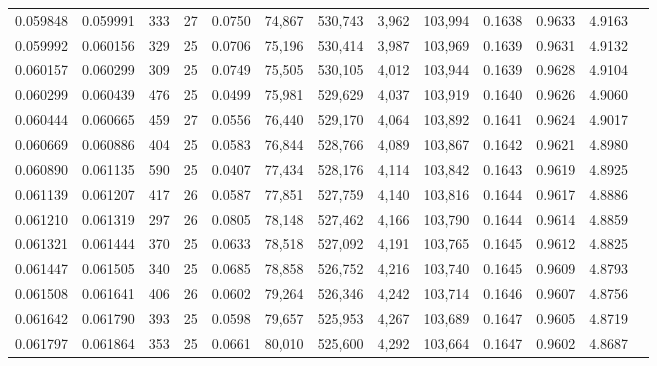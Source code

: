 \begin{tabular}{rrrrrrrrrrrrr}
0.059848 & 0.059991 & 333 &  27 &                                     0.0750 &  74,867 & 530,743 &   3,962 & 103,994 & 0.1638 & 0.9633 & 4.9163 \\
0.059992 & 0.060156 & 329 &  25 &                                     0.0706 &  75,196 & 530,414 &   3,987 & 103,969 & 0.1639 & 0.9631 & 4.9132 \\
0.060157 & 0.060299 & 309 &  25 &                                     0.0749 &  75,505 & 530,105 &   4,012 & 103,944 & 0.1639 & 0.9628 & 4.9104 \\
0.060299 & 0.060439 & 476 &  25 &                                     0.0499 &  75,981 & 529,629 &   4,037 & 103,919 & 0.1640 & 0.9626 & 4.9060 \\
0.060444 & 0.060665 & 459 &  27 &                                     0.0556 &  76,440 & 529,170 &   4,064 & 103,892 & 0.1641 & 0.9624 & 4.9017 \\
0.060669 & 0.060886 & 404 &  25 &                                     0.0583 &  76,844 & 528,766 &   4,089 & 103,867 & 0.1642 & 0.9621 & 4.8980 \\
0.060890 & 0.061135 & 590 &  25 &                                     0.0407 &  77,434 & 528,176 &   4,114 & 103,842 & 0.1643 & 0.9619 & 4.8925 \\
0.061139 & 0.061207 & 417 &  26 &                                     0.0587 &  77,851 & 527,759 &   4,140 & 103,816 & 0.1644 & 0.9617 & 4.8886 \\
0.061210 & 0.061319 & 297 &  26 &                                     0.0805 &  78,148 & 527,462 &   4,166 & 103,790 & 0.1644 & 0.9614 & 4.8859 \\
0.061321 & 0.061444 & 370 &  25 &                                     0.0633 &  78,518 & 527,092 &   4,191 & 103,765 & 0.1645 & 0.9612 & 4.8825 \\
0.061447 & 0.061505 & 340 &  25 &                                     0.0685 &  78,858 & 526,752 &   4,216 & 103,740 & 0.1645 & 0.9609 & 4.8793 \\
0.061508 & 0.061641 & 406 &  26 &                                     0.0602 &  79,264 & 526,346 &   4,242 & 103,714 & 0.1646 & 0.9607 & 4.8756 \\
0.061642 & 0.061790 & 393 &  25 &                                     0.0598 &  79,657 & 525,953 &   4,267 & 103,689 & 0.1647 & 0.9605 & 4.8719 \\
0.061797 & 0.061864 & 353 &  25 &                                     0.0661 &  80,010 & 525,600 &   4,292 & 103,664 & 0.1647 & 0.9602 & 4.8687 \\

\end{tabular}
